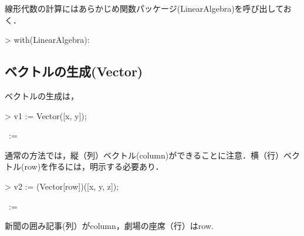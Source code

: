 線形代数の計算にはあらかじめ関数パッケージ(LinearAlgebra)を呼び出しておく．
\begin{MapleInput}
> with(LinearAlgebra):
\end{MapleInput}

\subsection{ベクトルの生成(Vector)}
ベクトルの生成は，
\begin{MapleInput}
> v1 := Vector([x, y]);
\end{MapleInput}
\begin{MapleOutput}
\, := \, \left[ \begin {array}{c} x\\ y\end {array} \right] 
\end{MapleOutput}
通常の方法では，縦（列）ベクトル(column)ができることに注意．横（行）ベクトル(row)を作るには，明示する必要あり．
\begin{MapleInput}
> v2 := (Vector[row])([x, y, z]);
\end{MapleInput}
\begin{MapleOutput}
\, := \,  
\end{MapleOutput}
新聞の囲み記事(列）がcolumn，劇場の座席（行）はrow.

